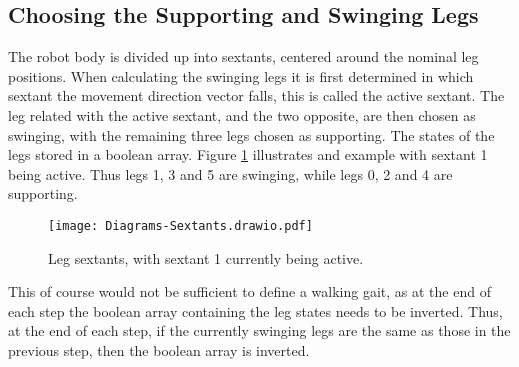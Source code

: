         \subsection{Choosing the Supporting and Swinging Legs} \label{sec:supp_swing_calc}
            The robot body is divided up into sextants, centered around the nominal leg positions. When calculating
            the swinging legs it is first determined in which sextant the movement direction vector falls, this is called the active sextant.
            The leg related with the active sextant, and the two opposite, are then chosen as swinging, with the remaining three legs chosen as supporting.
            The states of the legs stored in a boolean array.
            Figure \ref{fig:sextants} illustrates and example with sextant 1 being active. Thus legs 1, 3 and 5 are swinging, while legs 0, 2 and 4 are supporting.
            \begin{figure}[h]
                \centering
                \hspace{1.1cm}
                \texttt{[image: Diagrams-Sextants.drawio.pdf]}
                \caption{Leg sextants, with sextant 1 currently being active.} 
                \label{fig:sextants}
            \end{figure}
            
            \noindent
            This of course would not be sufficient to define a walking gait, as at the end of each step the boolean array containing the leg states needs to be inverted. Thus, at the end of each step, if the currently swinging legs are the same as those in the previous step, then the boolean array is inverted.
            

